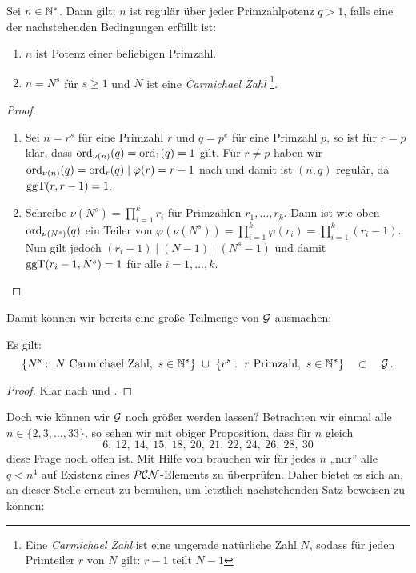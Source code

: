 \begin{lemma}
  \label{lemma:regular_speziell}
  Sei $n \in \mathbb{N}^\ast$. Dann gilt: $n$ ist regulär
  über jeder Primzahlpotenz $q>1$, falls eine der nachstehenden
  Bedingungen erfüllt ist:
  \begin{enumerate}
    \item $n$ ist Potenz einer beliebigen Primzahl.
    \item $n = N^s$ für $s\geq 1$ und $N$ ist eine 
      \emph{Carmichael Zahl}%
      \footnote{Eine \emph{Carmichael Zahl} ist eine ungerade
        natürliche Zahl $N$, sodass für jeden Primteiler $r$ von $N$ gilt: 
        $r-1$ teilt $N-1$}.
  \end{enumerate}
\end{lemma}
\begin{proof}
  \begin{enumerate}
    \item Sei $n = r^s$ für eine Primzahl $r$ und 
      $q = p^e$ für eine Primzahl $p$, so ist für  $r=p$ klar,
      dass $\operatorname{ord}_{\nu(n)}(q) = \operatorname{ord}_{1}(q)=1$ gilt. Für $r \neq p$ haben wir
      $\operatorname{ord}_{\nu(n)}(q) = \operatorname{ord}_r(q) \mid \varphi(r) = r-1$ nach
       und damit ist $(n,q)$ regulär, da
      $\operatorname{ggT}(r,r-1) = 1$.
    \item Schreibe $\nu(N^s) = \prod_{i=1}^k r_i$ für Primzahlen 
      $r_1,\ldots,r_k$. Dann ist wie oben $\operatorname{ord}_{\nu(N^s)}(q)$ ein
      Teiler von $\varphi(\nu(N^s)) = \prod_{i=1}^k\varphi(r_i) = 
      \prod_{i=1}^k (r_i-1)$. Nun gilt jedoch $(r_i-1) \mid (N-1) \mid (N^s-1)$
      und damit $\operatorname{ggT}(r_i-1, N^s) = 1$ für alle $i=1,\ldots,k$.
  \end{enumerate}
\end{proof}


Damit können wir bereits eine große Teilmenge von $\mathcal{G}$ ausmachen:

\begin{proposition}
  \label{prop:G}
  Es gilt:
  \[ \{ N^s:\ N\text{ Carmichael Zahl},\ s\in \N^\ast\} \ \cup\ 
    \{ r^s:\ r \text{ Primzahl},\ s\in \N^\ast\} \quad\subset\quad \G\,. \]
\end{proposition}
\begin{proof}
  Klar nach  und 
  .
\end{proof}

Doch wie können wir $\mathcal{G}$ noch größer werden lassen? 
Betrachten wir einmal alle $n\in \{ 2,3,\ldots,33\}$, so sehen wir mit
obiger Proposition, dass für $n$ gleich
\[ 6,\ 12,\ 14,\ 15,\ 18,\ 20,\ 21,\ 22,\ 24,\ 26,\ 28,\ 30\]
diese Frage noch offen ist.
Mit Hilfe von  brauchen wir für jedes $n$ 
„nur” alle $q < n^4$ auf Existenz eines $\mathcal{PCN}$-Elements zu überprüfen. Daher
bietet es sich an, an dieser Stelle erneut \sage zu bemühen, um letztlich
nachstehenden Satz beweisen zu können:

